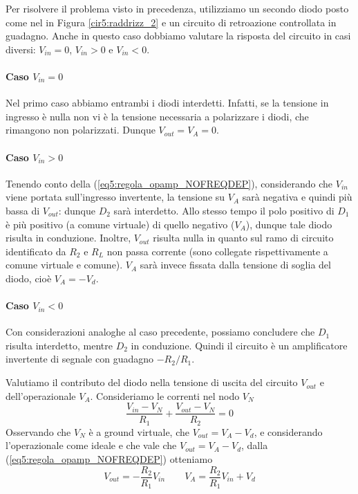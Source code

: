 Per risolvere il problema visto in precedenza, utilizziamo un secondo diodo posto come nel in Figura \ref{cir5:raddrizz_2} e un circuito di retroazione controllata in guadagno. Anche in questo caso dobbiamo valutare la risposta del circuito in casi diversi: $V_{in}=0$, $V_{in}>0$ e $V_{in}<0$.

\paragraph*{Caso $V_{in}=0$}

Nel primo caso abbiamo entrambi i diodi interdetti. Infatti, se la tensione in ingresso è nulla non vi è la tensione necessaria a polarizzare i diodi, che rimangono non polarizzati. Dunque $V_{out}=V_{A}=0$.

\paragraph*{Caso $V_{in}>0$}

Tenendo conto della (\ref{eq5:regola_opamp_NOFREQDEP}), considerando che $V_{in}$ viene portata sull'ingresso invertente, la tensione su $V_{A}$ sarà negativa e quindi più bassa di $V_{out}$: dunque $D_2$ sarà interdetto. Allo stesso tempo il polo positivo di $D_1$ è più positivo (a comune virtuale) di quello negativo ($V_{A}$), dunque tale diodo risulta in conduzione. Inoltre, $V_{out}$ risulta nulla in quanto sul ramo di circuito identificato da $R_2$ e $R_L$ non passa corrente (sono collegate rispettivamente a comune virtuale e comune). $V_{A}$ sarà invece fissata dalla tensione di soglia del diodo, cioè $V_{A}=-V_d$.

\paragraph*{Caso $V_{in}<0$}

Con considerazioni analoghe al caso precedente, possiamo concludere che $D_1$ risulta interdetto, mentre $D_2$ in conduzione. Quindi il circuito è un amplificatore invertente di segnale con guadagno $-R_2/R_1$.

Valutiamo il contributo del diodo nella tensione di uscita del circuito $V_{out}$ e dell'operazionale $V_{A}$. Consideriamo le correnti nel nodo $V_N$
$$\frac{V_{in}-V_N}{R_1} + \frac{V_{out}-V_N}{R_2} = 0$$
Osservando che $V_N$ è a ground virtuale, che $V_{out}=V_{A}-V_d$, e considerando l'operazionale come ideale e che vale che $V_{out}=V_{A}-V_d$, dalla (\ref{eq5:regola_opamp_NOFREQDEP}) otteniamo
\begin{equation}
V_{out}=-\frac{R_2}{R_1}V_{in} \qquad V_A = \frac{R_2}{R_1} V_{in} + V_d
\label{eq5:v_out_ottimizzato}
\end{equation}

